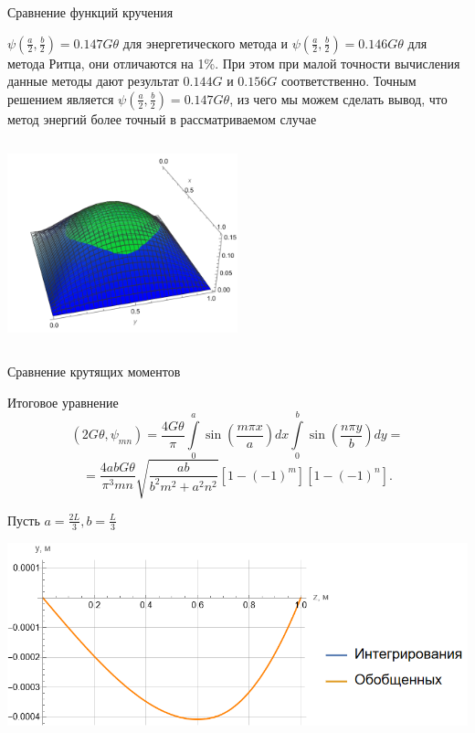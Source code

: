 \documentclass[ignoreonframetext,unicode]{beamer}
\begin{document}
\begin{frame}{Сравнение функций кручения}


\begin{block}{}
	$\psi\left(\frac{a}{2}, \frac{b}{2}\right) = 0.147G\theta$ для энергетического метода и $\psi\left(\frac{a}{2}, \frac{b}{2}\right) = 0.146G\theta$ для метода Ритца, они отличаются на 1\%. При этом при малой точности вычисления данные методы дают результат $0.144G$ и $0.156G$ соответственно. Точным решением является $\psi\left(\frac{a}{2}, \frac{b}{2}\right) = 0.147G\theta$, из чего мы можем сделать вывод, что метод энергий более точный в рассматриваемом случае
\end{block}

\begin{columns}
	\includegraphics[width=0.5\textwidth]{compare3d}
\end{columns}
	

\end{frame}

\begin{frame}{Сравнение крутящих моментов}
	
		\begin{block}{Итоговое уравнение}	
\[
(2G \theta, \psi_{mn}) = \frac{4 G \theta}{\pi}\int\limits_0^a \sin\left(\frac{m \pi x}{a}\right) dx \int\limits_0^b
\sin\left(\frac{n \pi y}{b}\right) dy = 
\]
\[
= \frac{4abG\theta}{\pi^3 mn} \sqrt{\frac{ab}{b^2 m^2 + a^2 n^2}}[1 - (-1)^m][1 - (-1)^n].
\]
		\end{block}
		Пусть $a = \frac{2 L}{3}, b = \frac{L}{3}$

		\includegraphics[width=1\textwidth]{g.4}

\end{frame}
\end{document}
